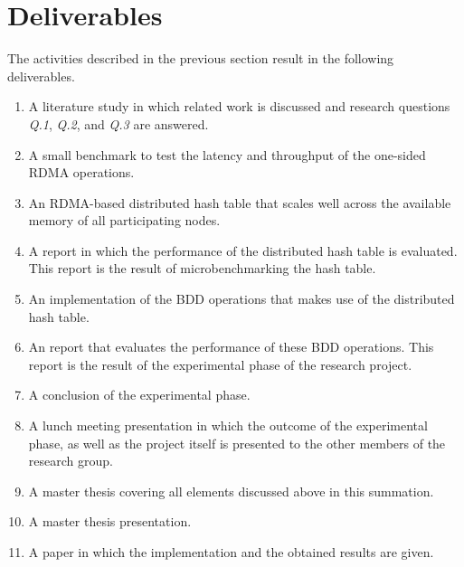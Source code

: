 \section{Deliverables}
The activities described in the previous section result in the following deliverables.

\begin{enumerate}
	\item A literature study in which related work is discussed and research questions \textit{Q.1}, \textit{Q.2}, and \textit{Q.3} are answered.
	\item A small benchmark to test the latency and throughput of the one-sided RDMA operations.
	\item An RDMA-based distributed hash table that scales well across the available memory of all participating nodes.
	\item A report in which the performance of the distributed hash table is evaluated. This report is the result of microbenchmarking the hash table.
	\item An implementation of the BDD operations that makes use of the distributed hash table.
	\item An report that evaluates the performance of these BDD operations. This report is the result of the experimental phase of the research project.
	\item A conclusion of the experimental phase.
	\item A lunch meeting presentation in which the outcome of the experimental phase, as well as the project itself is presented to the other members of the research group.
	\item A master thesis covering all elements discussed above in this summation.
	\item A master thesis presentation.
	\item A paper in which the implementation and the obtained results are given.
\end{enumerate}